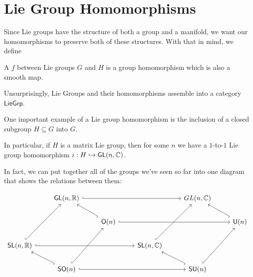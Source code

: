 \documentclass[../main.tex]{subfiles}
\begin{document}

\section{Lie Group Homomorphisms}

Since Lie groups have the structure of both a group and a manifold, 
we want our homomorphisms to preserve both of these structures. With that
in mind, we define

\begin{defn}
  A  $f$ between Lie groups $G$ and $H$ 
  is a group homomorphism which is also a smooth map.

  Unsurprisingly, Lie Groups and their homomorphisms assemble into a category
  $\mathsf{LieGrp}$.
\end{defn}

One important example of a Lie group homomorphism is the inclusion of a 
closed subgroup $H \subseteq G$ into $G$. 

In particular, if $H$ is a matrix Lie group, then for some $n$ 
we have a $1$-to-$1$ Lie group homomorphism 
$\iota : H \hookrightarrow \mathsf{GL}(n,\mathbb{C})$.

In fact, we can put together all of the groups we've seen so far into one 
diagram that shows the relations between them:

\[\begin{tikzcd}
	& {\mathsf{GL}(n,\mathbb{R})} &&& {GL(n,\mathbb{C})} \\
	&& {\mathsf{O}(n)} &&& {\mathsf{U}(n)} \\
	{\mathsf{SL}(n,\mathbb{R})} &&& {\mathsf{SL}(n,\mathbb{C})} \\
	& {\mathsf{SO}(n)} &&& {\mathsf{SU}(n)}
	\arrow[hook, from=4-2, to=3-1]
	\arrow[hook, from=3-1, to=1-2]
	\arrow[hook, from=4-2, to=2-3]
	\arrow[hook, from=2-3, to=1-2]
	\arrow[hook, from=4-5, to=2-6]
	\arrow[hook, from=4-5, to=3-4]
	\arrow[hook, from=3-4, to=1-5]
	\arrow[hook, from=2-6, to=1-5]
	\arrow[hook, from=1-2, to=1-5]
	\arrow[hook, from=3-1, to=3-4]
	\arrow[hook, from=4-2, to=4-5]
	\arrow[hook, from=2-3, to=2-6]
\end{tikzcd}\]
\end{document}
